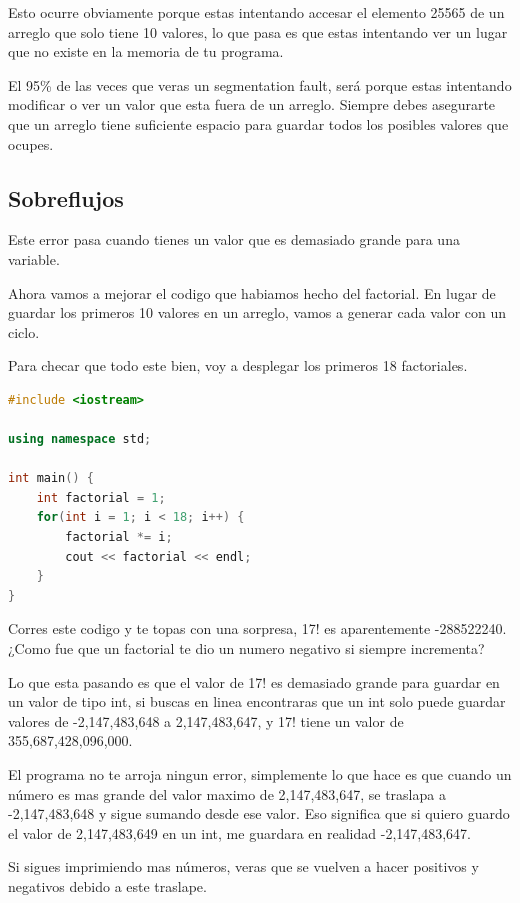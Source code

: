 \documentclass{article}
\begin{document}
Esto ocurre obviamente porque estas intentando accesar el elemento 25565 de un arreglo que solo tiene 10 valores, lo que pasa es que estas intentando ver un lugar que no existe en la memoria de tu programa.

El 95\% de las veces que veras un segmentation fault, será porque estas intentando modificar o ver un valor que esta fuera de un arreglo. Siempre debes asegurarte que un arreglo tiene suficiente espacio para guardar todos los posibles valores que ocupes.

\subsection{Sobreflujos}
Este error pasa cuando tienes un valor que es demasiado grande para una variable.

Ahora vamos a mejorar el codigo que habiamos hecho del factorial. En lugar de guardar los primeros 10 valores en un arreglo, vamos a generar cada valor con un ciclo.

Para checar que todo este bien, voy a desplegar los primeros 18 factoriales.

\begin{lstlisting}[language=C++, caption=Sobreflujo]
#include <iostream>

using namespace std;

int main() {
    int factorial = 1;
    for(int i = 1; i < 18; i++) {
        factorial *= i;
        cout << factorial << endl;
    }
}
\end{lstlisting}

Corres este codigo y te topas con una sorpresa, 17! es aparentemente -288522240. ¿Como fue que un factorial te dio un numero negativo si siempre incrementa?

Lo que esta pasando es que el valor de 17! es demasiado grande para guardar en un valor de tipo int, si buscas en linea encontraras que un int solo puede guardar valores de -2,147,483,648 a 2,147,483,647, y 17! tiene un valor de 355,687,428,096,000.

El programa no te arroja ningun error, simplemente lo que hace es que cuando un número es mas grande del valor maximo de 2,147,483,647, se traslapa a -2,147,483,648 y sigue sumando desde ese valor. Eso significa que si quiero guardo el valor de 2,147,483,649 en un int, me guardara en realidad -2,147,483,647.

Si sigues imprimiendo mas números, veras que se vuelven a hacer positivos y negativos debido a este traslape.
\end{document}
